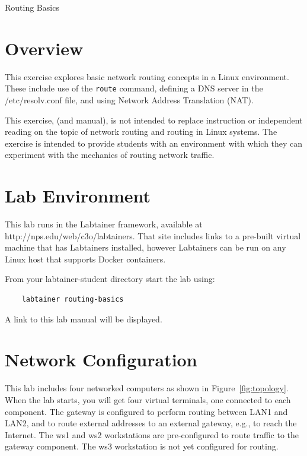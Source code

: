 


\begin{center}
{\LARGE Routing Basics}
\vspace{0.1in}\\
\end{center}

\copyrightnotice

\section{Overview}
This exercise explores basic network routing concepts 
in a Linux environment.  These include use of the \texttt{route}
command, defining a DNS server in the /etc/resolv.conf file,
and using Network Address Translation (NAT). 

This exercise, (and manual), is not intended to replace instruction
or independent reading on the topic of network routing and
routing in Linux systems. The exercise is intended to provide
students with an environment with which they can experiment
with the mechanics of routing network traffic.


\section{Lab Environment}
This lab runs in the Labtainer framework,
available at http://nps.edu/web/c3o/labtainers.
That site includes links to a pre-built virtual machine
that has Labtainers installed, however Labtainers can
be run on any Linux host that supports Docker containers.

From your labtainer-student directory start the lab using:
\begin{verbatim}
    labtainer routing-basics
\end{verbatim}
\noindent A link to this lab manual will be displayed.  

\section{Network Configuration}
This lab includes four networked computers as shown in Figure~\ref{fig:topology}.
When the lab starts, you will get four virtual terminals, one connected to each
component.
The gateway is configured to perform routing between LAN1 and LAN2, and to
route external addresses to an external gateway, e.g., to reach the Internet.
The ws1 and ws2 workstations are pre-configured to route traffic to the gateway
component.  The ws3 workstation is not yet configured for routing.

